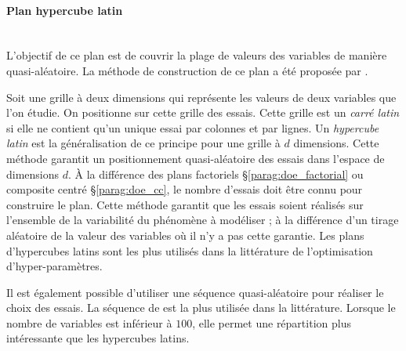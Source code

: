 \paragraph{Plan hypercube latin}\mbox{\label{parag:doe_lhs}} \\
L'objectif de ce plan est de couvrir la plage de valeurs des variables de manière quasi-aléatoire.
La méthode de construction de ce plan a été proposée par \citeauthor{mckay_comparison_1979} \cite{mckay_comparison_1979}. %

Soit une grille à deux dimensions qui représente les valeurs de deux variables que l'on étudie.
On positionne sur cette grille des essais.
Cette grille est un \textit{carré latin} si elle ne contient qu'un unique essai par colonnes et par lignes.
Un \textit{hypercube latin} est la généralisation de ce principe pour une grille à $d$ dimensions.
Cette méthode garantit un positionnement quasi-aléatoire des essais dans l'espace de dimensions $d$.
À la différence des plans factoriels §\ref{parag:doe_factorial} ou composite centré §\ref{parag:doe_cc}, le nombre d'essais doit être connu pour construire le plan.
Cette méthode garantit que les essais soient réalisés sur l'ensemble de la variabilité du phénomène à modéliser ; à la différence d'un tirage aléatoire de la valeur des variables où il n'y a pas cette garantie.
Les plans d'hypercubes latins sont les plus utilisés dans la littérature de l'optimisation d'hyper-paramètres.

Il est également possible d'utiliser une séquence quasi-aléatoire pour réaliser le choix des essais.
La séquence de \citeauthor{sobol_distribution_1967} \cite{sobol_distribution_1967} est la plus utilisée dans la littérature.
Lorsque le nombre de variables est inférieur à $100$, elle permet une répartition plus intéressante que les hypercubes latins.

